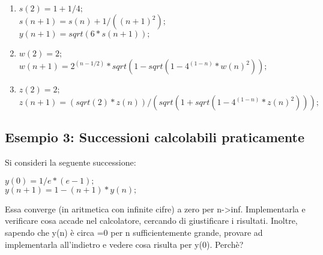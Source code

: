 \begin{enumerate}
	\item $s(2)=1+1/4;$ \\ $s(n+1)=s(n)+1/((n+1)^2);$ \\ $y(n+1)= sqrt(6*s(n+1));$
	\item $w(2)=2;$ \\ $w(n+1)=2^(n-1/2)*sqrt(1-sqrt(1-4^(1-n)*w(n)^2));$
	\item $z(2)=2;$ \\ $z(n+1)=(sqrt(2)*z(n))/(sqrt(1+sqrt(1-4^(1-n)*z(n)^2)));$
	\linebreak[4]
	\linebreak[4]
\end{enumerate}




\subsection{Esempio 3: Successioni calcolabili praticamente}

Si consideri la seguente successione:

\begin{center}
	$y(0)=1/e*(e-1);$
	\\
	$y(n+1)=1-(n+1)*y(n);$
\end{center}

Essa converge (in aritmetica con infinite cifre) a zero per n->inf. Implementarla e verificare cosa accade nel calcolatore, cercando di giustificare i risultati. Inoltre, sapendo che y(n) è circa =0 per n sufficientemente grande, provare ad implementarla all'indietro e vedere cosa risulta per y(0). Perchè?


